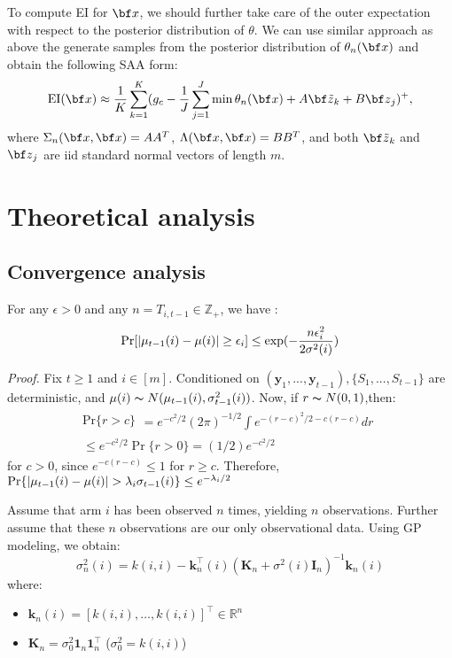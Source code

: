 \documentclass[opre,sglanonrev]{informs4}
\begin{document}
To compute EI for ${\bf x}$, we should further take care of the outer expectation with respect to the posterior distribution of $\theta$. We can use similar approach as above the generate samples from the posterior distribution of $\theta_n({\bf x})$ and obtain the following SAA form:
$$
\text{EI}({\bf x}) \approx \frac{1}{K}\sum_{k=1}^{K} (g_c-  \frac{1}{J}\sum_{j=1}^{J} \min \theta_n({\bf x}) + A{\bf \tilde{z}}_k + B{\bf z}_j )^+,
$$ 
where $\Sigma_n({\bf x},{\bf x}) = AA^T$, $\Lambda({\bf x},{\bf x}) = BB^T$, and both ${\bf \tilde{z}}_k$ and ${\bf z}_j$ are iid standard normal vectors of length $m$.

\section{Theoretical analysis}
\subsection{Convergence analysis}
\begin{lemma}
For any $\epsilon > 0$ and any $n = T_{i,t-1} \in \mathbb{Z}_+$, we have :
$$
\textnormal{Pr}[|\mu_{t-1}(i)-\mu(i)|\geq \epsilon_i]\leq \exp(-\frac{n\epsilon_i^2}{2\sigma^2(i)})
$$
\end{lemma} 
\textit{Proof.} Fix $t\geq 1$ and $i\in [m]$. Conditioned on $(\mathbf{y}_1,...,\mathbf{y}_{t-1}), \{S_1,...,S_{t-1}\}$ are deterministic, and $\mu(i)\thicksim N(\mu_{t-1}(i),\sigma_{t-1}^2(i))$. Now, if $r\thicksim N(0,1)$,then: 
$$\begin{gathered}
\mathrm{Pr}\{r>c\}
\begin{aligned}
=e^{-c^2/2}(2\pi)^{-1/2}\int e^{-(r-c)^2/2-c(r-c)}dr
\end{aligned} \\
\leq e^{-c^2/2}\Pr\{r>0\}=(1/2)e^{-c^2/2}
\end{gathered}$$
for $c>0$, since $e^{-c(r-c)}\leq 1$ for $r\geq c$. Therefore, $\textnormal{Pr}\{|\mu_{t-1}(i)-\mu(i)|>\lambda_i \sigma_{t-1}(i)\}\leq e^{-\lambda_i/2}$

Assume that arm $i$ has been observed $n$ times, yielding $n$ observations. Further assume that these $n$ observations are our only observational data. Using GP modeling, we obtain:
\[
\sigma_n^2(i) = k(i,i) - \mathbf{k}_n^\top(i)(\mathbf{K}_n + \sigma^2(i)\mathbf{I}_n)^{-1}\mathbf{k}_n(i)
\]
where:
\begin{itemize}
    \item $\mathbf{k}_n(i) = [k(i,i),\dots,k(i,i)]^\top \in \mathbb{R}^n$
    \item $\mathbf{K}_n = \sigma_0^2\mathbf{1}_n\mathbf{1}_n^\top$ ($\sigma_0^2 = k(i,i)$)
\end{itemize} %
\end{document}
